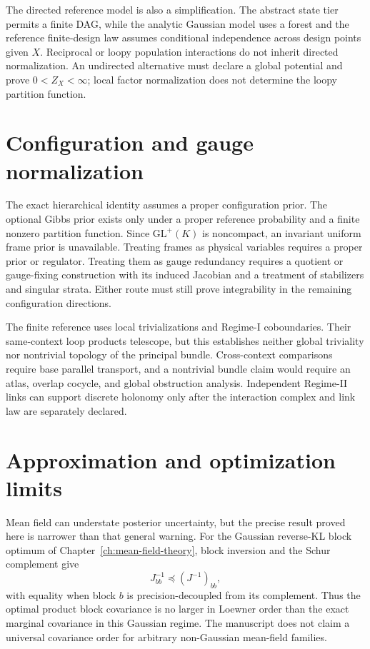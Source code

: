 The directed reference model is also a simplification. The abstract state tier permits a finite DAG, while the analytic Gaussian model uses a forest and the reference finite-design law assumes conditional independence across design points given \(X\). Reciprocal or loopy population interactions do not inherit directed normalization. An undirected alternative must declare a global potential and prove \(0<Z_X<\infty\); local factor normalization does not determine the loopy partition function.

\section{Configuration and gauge normalization}

The exact hierarchical identity assumes a proper configuration prior. The optional Gibbs prior exists only under a proper reference probability and a finite nonzero partition function. Since \(\mathrm{GL}^{+}(K)\) is noncompact, an invariant uniform frame prior is unavailable. Treating frames as physical variables requires a proper prior or regulator. Treating them as gauge redundancy requires a quotient or gauge-fixing construction with its induced Jacobian and a treatment of stabilizers and singular strata. Either route must still prove integrability in the remaining configuration directions.

The finite reference uses local trivializations and Regime-I coboundaries. Their same-context loop products telescope, but this establishes neither global triviality nor nontrivial topology of the principal bundle. Cross-context comparisons require base parallel transport, and a nontrivial bundle claim would require an atlas, overlap cocycle, and global obstruction analysis. Independent Regime-II links can support discrete holonomy only after the interaction complex and link law are separately declared.

\section{Approximation and optimization limits}

Mean field can understate posterior uncertainty, but the precise result proved here is narrower than that general warning. For the Gaussian reverse-KL block optimum of Chapter~\ref{ch:mean-field-theory}, block inversion and the Schur complement give
\begin{equation}
J_{bb}^{-1}\preceq(J^{-1})_{bb},
\label{eq:gaussian-mean-field-block-underdispersion}
\end{equation}
with equality when block \(b\) is precision-decoupled from its complement. Thus the optimal product block covariance is no larger in Loewner order than the exact marginal covariance in this Gaussian regime. The manuscript does not claim a universal covariance order for arbitrary non-Gaussian mean-field families.

